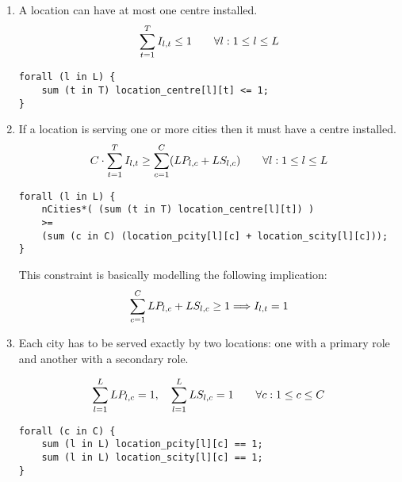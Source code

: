 \begin{enumerate}
\setcounter{enumi}{\value{equation}}

    \item A location can have at most one centre installed.
    \begin{equation}
    \sum_{t = 1}^{T} I_{l, t} \le 1
    \qquad \forall l: 1 \le l \le L
    \label{cstr:one-loc-one-centre-1}
    \end{equation}
    
\begin{lstlisting}
forall (l in L) {
	sum (t in T) location_centre[l][t] <= 1;
}
\end{lstlisting}
    
    \item If a location is serving one or more cities then it must have a centre installed.
    \begin{equation}
    C \cdot \sum_{t = 1}^{T} I_{l, t}
    \ge
    \sum_{c = 1}^{C} (LP_{l, c} + LS_{l, c})
    \qquad \forall l: 1 \le l \le L
    \label{cstr:serving-location-with-centre}
    \end{equation}
    
\begin{lstlisting}
forall (l in L) {
	nCities*( (sum (t in T) location_centre[l][t]) )
	>= 
	(sum (c in C) (location_pcity[l][c] + location_scity[l][c]));
}
\end{lstlisting}
	
	This constraint is basically modelling the following implication:
	\[
	\sum_{c = 1}^{C} LP_{l, c} + LS_{l, c} \ge 1
	\Longrightarrow
	I_{l, t} = 1
	\]
	
	\item Each city has to be served exactly by two locations: one with a primary role and
	another with a secondary role.
    
    \begin{equation}
    \sum_{l = 1}^{L} LP_{l, c} = 1, \quad
	\sum_{l = 1}^{L} LS_{l, c} = 1
	\qquad \forall c: 1 \le c \le C
	\label{cstr:cities-served-by-location}
    \end{equation}
    
\begin{lstlisting}
forall (c in C) {
	sum (l in L) location_pcity[l][c] == 1;
	sum (l in L) location_scity[l][c] == 1;
}
\end{lstlisting}
    

\end{enumerate}
